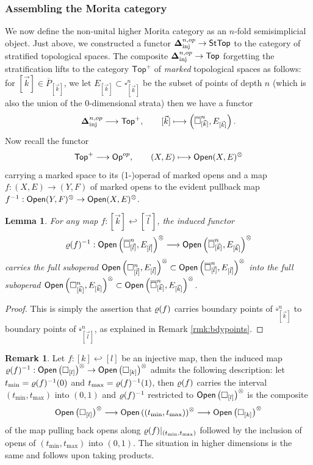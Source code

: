 \documentclass[10pt, reqno, twoside
, final
]{amsart}
\numberwithin{equation}{subsection}%
\theoremstyle{definition}
\theoremstyle{definition}
\theoremstyle{definition}
\theoremstyle{definition}
\theoremstyle{definition}
\theoremstyle{definition}
\theoremstyle{definition}
\theoremstyle{definition}
\theoremstyle{definition}
\theoremstyle{plain}
\theoremstyle{definition}
\theoremstyle{plain}
\theoremstyle{definition}
\theoremstyle{plain}
\theoremstyle{definition}
\newtheorem{rmk}[defn]{Remark}
\theoremstyle{definition}
\theoremstyle{plain}
\newtheorem{lem}[defn]{Lemma}
\theoremstyle{plain}
\theoremstyle{definition}
\theoremstyle{plain}
\theoremstyle{plain}
\theoremstyle{plain}
\begin{document}
\subsubsection{Assembling the Morita category}
We now define the non-unital higher Morita category as an $n$-fold semisimplicial object. Just above, we constructed a functor $\boldsymbol{\Delta}^{n,op}_{\mathrm{inj}}\rightarrow \mathsf{StTop}$ to the category of stratified topological spaces. The composite $\boldsymbol{\Delta}^{n,op}_{\mathrm{inj}}\rightarrow \mathsf{Top}$ forgetting the stratification lifts to the category $\mathsf{Top}^+$ of \emph{marked} topological spaces as follows: for $[\vec{k}]\in \overline{P}_{[\vec{k}]}$, we let $E_{[\vec{k}]}\subset \square^n_{[\vec{k}]}$ be the subset of points of depth $n$ (which is also the union of the 0-dimensional strata) then we have a functor
\[ \boldsymbol{\Delta}^{n,op}_{\mathrm{inj}}\longrightarrow \mathsf{Top}^+,\quad\quad [\vec{k}]\longmapsto \left(\overline{\square}^n_{[\vec{k}]},E_{[\vec{k}]}\right).  \]
Now recall the functor 
\[ \mathsf{Top}^+\longrightarrow \mathsf{Op}^{op},\quad \quad (X,E)\longmapsto \mathsf{Open}(X,E)^{\otimes}  \]
carrying a marked space to its (1-)operad of marked opens and a map $f:(X,E)\rightarrow (Y,F)$ of marked opens to the evident pullback map $f^{-1}:\mathsf{Open}(Y,F)^{\otimes}\rightarrow \mathsf{Open}(X,E)^{\otimes}$.  
\begin{lem}
For any map $f:[\vec{k}]\hookleftarrow [\vec{l}]$, the induced functor
\[ \varrho(f)^{-1}:\mathsf{Open}\left(\overline{\square}^n_{[\vec{l}]},E_{[\vec{l}]}\right)^{\otimes} \longrightarrow \mathsf{Open}\left(\overline{\square}^n_{[\vec{k}]},E_{[\vec{k}]}\right)^{\otimes} \]
carries the full suboperad $\mathsf{Open}\left(\square^n_{[\vec{l}]},E_{[\vec{l}]}\right)^{\otimes}\subset \mathsf{Open}\left(\overline{\square}^n_{[\vec{l}]},E_{[\vec{l}]}\right)^{\otimes} $ into the full suboperad $\mathsf{Open}\left(\square^n_{[\vec{k}]},E_{[\vec{k}]}\right)^{\otimes}\subset \mathsf{Open}\left(\overline{\square}^n_{[\vec{k}]},E_{[\vec{k}]}\right)^{\otimes} $.
\end{lem}
\begin{proof}
This is simply the assertion that $\varrho(f)$ carries boundary points of $\overline{\square}^n_{[\vec{k}]}$ to boundary points of $\overline{\square}^n_{[\vec{l}]}$, as explained in Remark \ref{rmk:bdypoints}.    
\end{proof}
\begin{rmk}
Let $f:[k]\hookleftarrow [l]$ be an injective map, then the induced map $\varrho(f)^{-1}:\mathsf{Open}\left(\square_{[l]}\right)^{\otimes}\rightarrow \mathsf{Open}\left(\square_{[k]}\right)^{\otimes}$ admits the following description: let $t_{\mathrm{min}}=\varrho(f)^{-1}(0)$ and  $t_{\mathrm{max}}=\varrho(f)^{-1}(1)$, then $\varrho(f)$ carries the interval $(t_{\mathrm{min}},t_{\mathrm{max}})$ into $(0,1)$ and $\varrho(f)^{-1}$ restricted to $\mathsf{Open}\left(\square_{[l]}\right)^{\otimes}$ is the composite 
\[ \mathsf{Open}\left(\square_{[l]}\right)^{\otimes}\longrightarrow\mathsf{Open}\left((t_{\mathrm{min}},t_{\mathrm{max}})\right)^{\otimes}\longrightarrow \mathsf{Open}\left(\square_{[k]}\right)^{\otimes}  \]
of the map pulling back opens along $\varrho(f)|_{(t_{\mathrm{min}},t_{\mathrm{max}})}$ followed by the inclusion of opens of $(t_{\mathrm{min}},t_{\mathrm{max}})$ into $(0,1)$. The situation in higher dimensions is the same and follows upon taking products.
\end{rmk}
\end{document}
